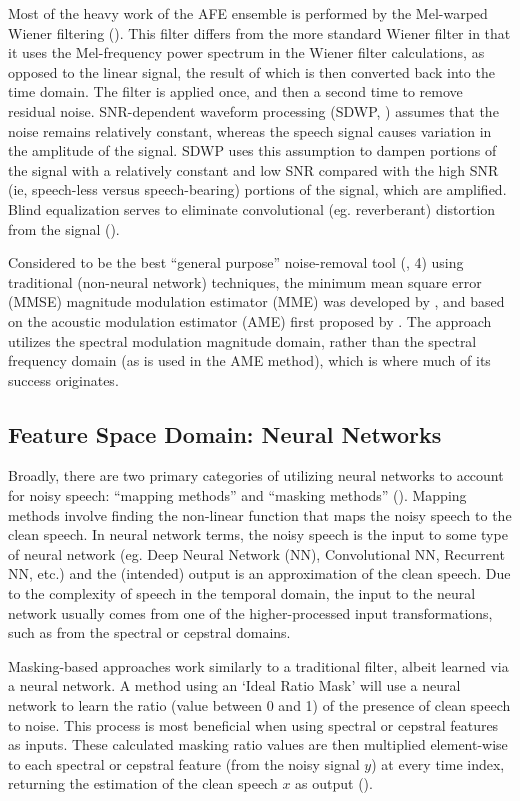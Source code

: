\documentclass[dissertation,copyright]{uathesis}
\begin{document}
Most of the heavy work of the AFE ensemble is performed by the Mel-warped Wiener filtering (\cite{agarwal:99,li:14}).  This filter differs from the more standard Wiener filter in that it uses the Mel-frequency power spectrum in the Wiener filter calculations, as opposed to the linear signal, the result of which is then converted back into the time domain.  The filter is applied once, and then a second time to remove residual noise.  SNR-dependent waveform processing (SDWP, \cite{macho:01}) assumes that the noise remains relatively constant, whereas the speech signal causes variation in the amplitude of the signal.  SDWP uses this assumption to dampen portions of the signal with a relatively constant and low SNR compared with the high SNR (ie, speech-less versus speech-bearing) portions of the signal, which are amplified.  Blind equalization serves to eliminate convolutional (eg. reverberant) distortion from the signal (\cite{mauuary:98}).

Considered to be the best ``general purpose'' noise-removal tool (\cite{zhang:17}, 4) using traditional (non-neural network) techniques, the minimum mean square error (MMSE) magnitude modulation estimator (MME) was developed by \cite{paliwal:12}, and based on the acoustic modulation estimator (AME) first proposed by \cite{ephraim:84}.  The approach utilizes the spectral modulation magnitude domain, rather than the spectral frequency domain (as is used in the AME method), which is where much of its success originates.

\subsection{Feature Space Domain: Neural Networks}

Broadly, there are two primary categories of utilizing neural networks to account for noisy speech: ``mapping methods'' and ``masking methods'' (\cite{zhang:17}).  Mapping methods involve finding the non-linear function that maps the noisy speech to the clean speech.  In neural network terms, the noisy speech is the input to some type of neural network (eg. Deep Neural Network (NN), Convolutional NN, Recurrent NN, etc.) and the (intended) output is an approximation of the clean speech.  Due to the complexity of speech in the temporal domain, the input to the neural network usually comes from one of the higher-processed input transformations, such as from the spectral or cepstral domains.

Masking-based approaches work similarly to a traditional filter, albeit learned via a neural network. A method using an `Ideal Ratio Mask' will use a neural network to learn the ratio (value between 0 and 1) of the presence of clean speech to noise.  %
This process is most beneficial when using spectral or cepstral features as inputs.  These calculated masking ratio values are then multiplied element-wise to each spectral or cepstral feature (from the noisy signal $y$) at every time index, returning the estimation of the clean speech $x$ as output (\cite{zhang:17}).
\end{document}
